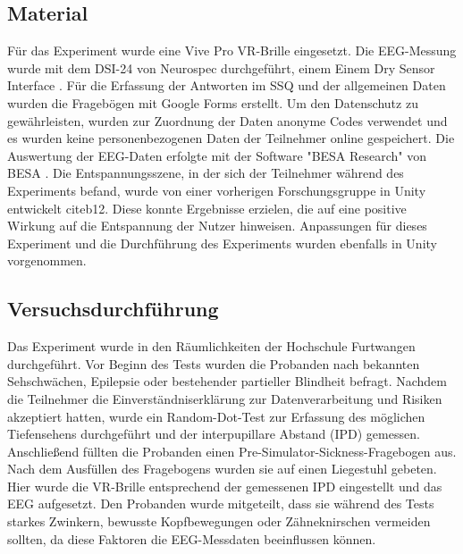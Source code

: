 \documentclass[conference]{IEEEtran}
\begin{document}
\subsection{Material}
Für das Experiment wurde eine Vive Pro VR-Brille \cite{b11} eingesetzt. Die EEG-Messung wurde mit dem DSI-24 von Neurospec durchgeführt, einem Einem Dry Sensor Interface \cite{b9}. Für die Erfassung der Antworten im SSQ und der allgemeinen Daten wurden die Fragebögen mit Google Forms erstellt. Um den Datenschutz zu gewährleisten, wurden zur Zuordnung der Daten anonyme Codes verwendet und es wurden keine personenbezogenen Daten der Teilnehmer online gespeichert. Die Auswertung der EEG-Daten erfolgte mit der Software "BESA Research" von BESA \cite{b10}. Die Entspannungsszene, in der sich der Teilnehmer während des Experiments befand, wurde von einer vorherigen Forschungsgruppe in Unity entwickelt cite{b12}. Diese konnte Ergebnisse erzielen, die auf eine positive Wirkung auf die Entspannung der Nutzer hinweisen. Anpassungen für dieses Experiment und die Durchführung des Experiments wurden ebenfalls in Unity vorgenommen.

\subsection{Versuchsdurchführung}
Das Experiment wurde in den Räumlichkeiten der Hochschule Furtwangen durchgeführt. Vor Beginn des Tests wurden die Probanden nach bekannten Sehschwächen, Epilepsie oder bestehender partieller Blindheit befragt. Nachdem die Teilnehmer die Einverständniserklärung zur Datenverarbeitung und Risiken akzeptiert hatten, wurde ein Random-Dot-Test zur Erfassung des möglichen Tiefensehens durchgeführt und der interpupillare Abstand (IPD) gemessen. Anschließend füllten die Probanden einen Pre-Simulator-Sickness-Fragebogen aus. Nach dem Ausfüllen des Fragebogens wurden sie auf einen Liegestuhl gebeten. Hier wurde die VR-Brille entsprechend der gemessenen IPD eingestellt und das EEG aufgesetzt. Den Probanden wurde mitgeteilt, dass sie während des Tests starkes Zwinkern, bewusste Kopfbewegungen oder Zähneknirschen vermeiden sollten, da diese Faktoren die EEG-Messdaten beeinflussen können.
\end{document}
